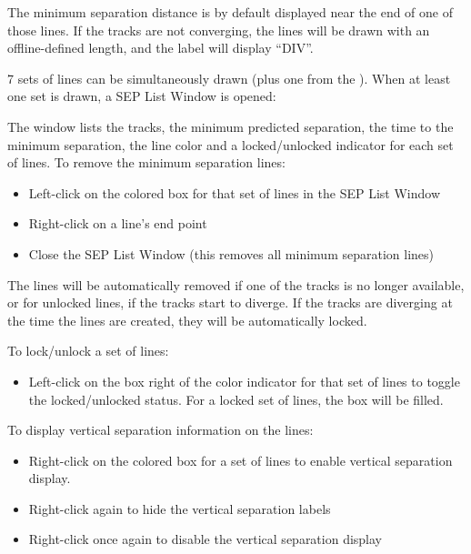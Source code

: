 \documentclass[a4paper,oneside,11pt]{memoir}
\newcommand{\winref}[1]{\textit{\titleref{#1}}}
\newcommand\capdimage[2]{
\begin{center}
\hspace{1em}%
\vtop{%
\centering
\texttt{[image: \#1]}%
\captionof{figure}{#2}%
}%
\end{center}
\ignorespaces}
\begin{document}
\bigskip

The minimum separation distance is by default displayed near the end of one of those lines. If the tracks are not converging, the lines will be drawn with an offline-defined length, and the label will display “DIV”.

\bigskip

7 sets of lines can be simultaneously drawn (plus one from the \winref{win:card}). When at least one set is drawn, a SEP List Window is opened:

\bigskip

\capdimage{img/seplist.png}{SEP List}

The window lists the tracks, the minimum predicted separation, the time to the minimum separation, the line color and a locked/unlocked indicator for each set of lines.
To remove the minimum separation lines:

\begin{itemize}
    \item Left-click on the colored box for that set of lines in the SEP List Window
    \item Right-click on a line’s end point
    \item Close the SEP List Window (this removes all minimum separation lines)
\end{itemize}

The lines will be automatically removed if one of the tracks is no longer available, or for unlocked lines, if the tracks start to diverge. If the tracks are diverging at the time the lines are created, they will be automatically locked.

\bigskip

To lock/unlock a set of lines:

\begin{itemize}
    \item Left-click on the box right of the color indicator for that set of lines to toggle the locked/unlocked status. For a locked set of lines, the box will be filled.
\end{itemize}

\bigskip

To display vertical separation information on the lines:

\begin{itemize}
    \item Right-click on the colored box for a set of lines to enable vertical separation display.
    \item Right-click again to hide the vertical separation labels
    \item Right-click once again to disable the vertical separation display
\end{itemize}
\end{document}
